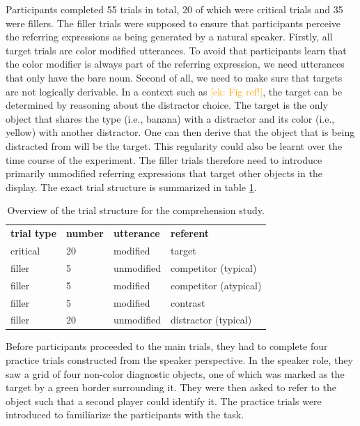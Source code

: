 \documentclass[10pt,letterpaper]{article}
\newcommand{\ek}[1]{\textcolor{Orange}{[ek: #1]}}
\begin{document}
Participants completed 55 trials in total, 20 of which were critical trials and 35 were fillers. The filler trials were supposed to ensure that participants perceive the referring expressions as being generated by a natural speaker. Firstly, all target trials are color modified utterances. To avoid that participants learn that the color modifier is always part of the referring expression, we need utterances that only have the bare noun. Second of all, we need to make sure that targets are not logically derivable. In a context such as \ek{Fig ref!}, the target can be determined by reasoning about the distractor choice. The target is the only object that shares the type (i.e., banana) with a distractor and its color (i.e., yellow) with another distractor. One can then derive that the object that is being distracted from will be the target. This regularity could also be learnt over the time course of the experiment. The filler trials therefore need to introduce primarily unmodified referring expressions that target other objects in the display. The exact trial structure is summarized in table \ref{tab:trialstructure}.

\begin{table}[]
	\begin{tabular}{llll}
	\textbf{trial type} & \textbf{number} & \textbf{utterance} & \textbf{referent}           \\
	critical            & 20              & modified           & target                      \\
	filler              & 5               & unmodified         & competitor (typical)  \\
	filler              & 5               & modified           & competitor (atypical) \\
	filler              & 5               & modified           & contrast                    \\
	filler              & 20              & unmodified         & distractor (typical)       
	\end{tabular}
	\vspace{2mm}
	\caption{Overview of the trial structure for the comprehension study.}
	\label{tab:trialstructure}
\end{table}

Before participants proceeded to the main trials, they had to complete four practice trials constructed from the speaker perspective. In the speaker role, they saw a grid of four non-color diagnostic objects, one of which was marked as the target by a green border surrounding it. They were then asked to refer to the object such that a second player could identify it. The practice trials were introduced to familiarize the participants with the task.
\end{document}
